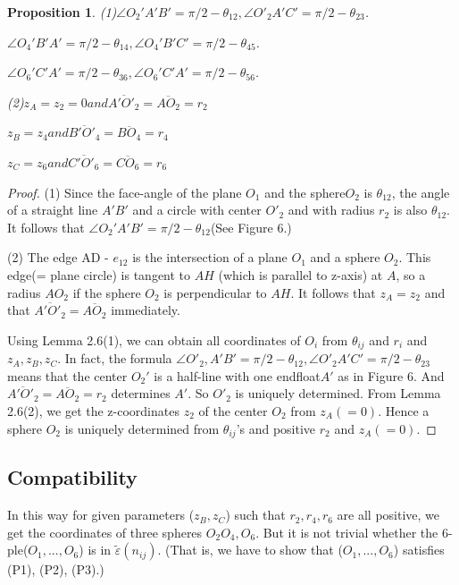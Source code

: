 \documentclass[dvipdfmx]{interact}
\theoremstyle{plain}%
\newtheorem{proposition}[theorem]{Proposition}
\theoremstyle{definition}
\theoremstyle{remark}
\theoremstyle{problemstyle}
\begin{document}
\begin{proposition}
 (1)$\angle O_2'A'B' = \pi/2 - \theta_{12}, \angle
 O'_2A'C'=\pi/2-\theta_{23}$.

  $\angle O_4'B'A' = \pi/2 - \theta_{14}, \angle O_4'B'C' = \pi/2 -
 \theta_{45}$.

 $\angle O_6'C'A' = \pi/2 - \theta_{36}, \angle O_6'C'A' = \pi/2 - \theta_{56}$.

 (2)$z_A = z_2 = 0 and \overline{A'O'_2} = \overline{AO_2} = r_2$

 $z_B = z_4 and \overline{B'O'_4} = \overline{BO_4} = r_4$

 $z_C = z_6 and \overline{C'O'_6} = \overline{CO_6} = r_6$
\end{proposition}

\begin{proof}
 (1) Since the face-angle of the plane $O_1$ and the sphere$O_2$ is
 $\theta_{12}$, the angle of a straight line $A'B'$ and a circle with
 center $O'_2$ and with radius $r_2$ is also $\theta_{12}$. It follows
 that $\angle O_2'A'B' = \pi/2 - \theta_{12}$(See Figure 6.)
 
 (2) The edge AD - $e_{12}$ is the intersection of a plane $O_1$ and a
 sphere $O_2$. This edge(= plane circle) is tangent to $AH$ (which is
 parallel to z-axis) at $A$, so a radius $AO_2$ if the sphere $O_2$ is
 perpendicular to $AH$. It follows that $z_A=z_2$ and that
 $\overline{A'O'_2} = \overline{AO_2}$ immediately.

 Using Lemma 2.6(1), we can obtain all coordinates of $O_i$ from
 $\theta_{ij}$ and $r_i$ and $z_A, z_B, z_C$. In fact, the formula
 $\angle O'_2, A'B' = \pi/2 - \theta_{12}, \angle O'_{2}A'C' = \pi/2 -
 \theta_{23}$ means that the center $O_2'$ is a half-line with one
 endfloat$A'$ as in Figure 6.
 And $\overline{A'O'_2} = \overline{AO_2} = r_2$ determines $A'$.
 So $O'_2$ is uniquely determined. From Lemma 2.6(2), we get the
 z-coordinates $z_2$ of the center $O_2$ from $z_A(=0)$. Hence a sphere
 $O_2$ is uniquely determined from $\theta_{ij}$'s and positive $r_2$
 and $z_A(= 0)$.
\end{proof}

\subsection{Compatibility}
In this way for given parameters ($z_B, z_C$) such that $r_2, r_4, r_6$
are all positive, we get the coordinates of three spheres 
$O_2 O_4, O_6$. But it is not trivial whether the 6-ple($O_1, ..., O_6$) is
in $\tilde\varepsilon(n_{ij})$. (That is, we have to show that ($O_1,
..., O_6$) satisfies (P1), (P2), (P3).)
\end{document}
